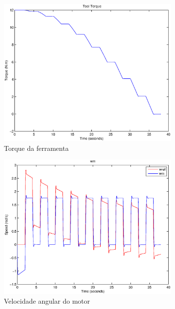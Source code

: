 \documentclass{article}
\begin{document}
\begin{figure}[H]
\begin{subfigure}{0.3\textwidth}
		\includegraphics[width=\linewidth]{matlab/t6}
		\caption{Torque da ferramenta}
	\end{subfigure}
	\begin{subfigure}{0.3\textwidth}
		\includegraphics[width=\linewidth]{matlab/wm6}
		\caption{Velocidade angular do motor}
	\end{subfigure}
	\begin{subfigure}{0.3\textwidth}

\end{subfigure}
\end{figure}
\end{document}
